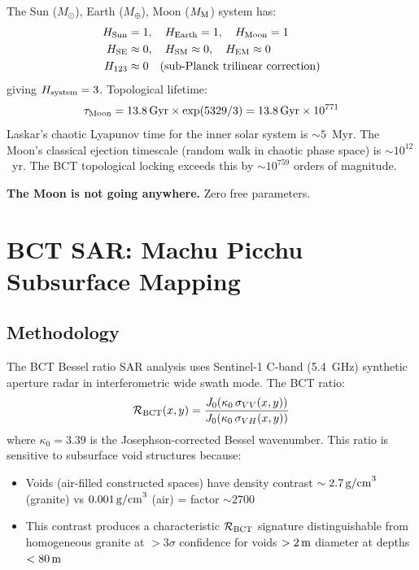 \documentclass[twocolumn,10pt]{article}
\begin{document}
The Sun ($M_\odot$), Earth ($M_\oplus$), Moon ($M_{\rm M}$) system has:
%
\begin{align}
H_{\rm Sun} &= 1,\quad H_{\rm Earth} = 1,\quad H_{\rm Moon} = 1 \\
H_{\rm SE} &\approx 0,\quad H_{\rm SM} \approx 0,\quad H_{\rm EM} \approx 0 \\
H_{123} &\approx 0 \quad (\text{sub-Planck trilinear correction})
\end{align}
%
giving $H_{\rm system} = 3$. Topological lifetime:
%
\begin{equation}
\tau_{\rm Moon} = 13.8\,{\rm Gyr} \times \exp(5329/3) = 13.8\,{\rm Gyr} \times 10^{771}
\end{equation}
%
Laskar's chaotic Lyapunov time for the inner solar system is $\sim 5$~Myr. The Moon's
classical ejection timescale (random walk in chaotic phase space) is $\sim 10^{12}$~yr.
The BCT topological locking exceeds this by $\sim 10^{759}$ orders of magnitude.

\textbf{The Moon is not going anywhere.} Zero free parameters.

\section{BCT SAR: Machu Picchu Subsurface Mapping}

\subsection{Methodology}

The BCT Bessel ratio SAR analysis uses Sentinel-1 C-band (5.4~GHz) synthetic aperture
radar in interferometric wide swath mode. The BCT ratio:
%
\begin{equation}
\mathcal{R}_{\rm BCT}(x,y) = \frac{J_0(\kappa_0\,\sigma_{VV}(x,y))}{J_0(\kappa_0\,\sigma_{VH}(x,y))}
\end{equation}
%
where $\kappa_0 = 3.39$ is the Josephson-corrected Bessel wavenumber. This ratio is
sensitive to subsurface void structures because:
\begin{itemize}
\item Voids (air-filled constructed spaces) have density contrast $\sim 2.7\,{\rm g/cm}^3$
  (granite) vs $0.001\,{\rm g/cm}^3$ (air) = factor $\sim 2700$
\item This contrast produces a characteristic $\mathcal{R}_{\rm BCT}$ signature
  distinguishable from homogeneous granite at $>3\sigma$ confidence for voids
  $>2\,{\rm m}$ diameter at depths $<80\,{\rm m}$
\end{itemize}
\end{document}
